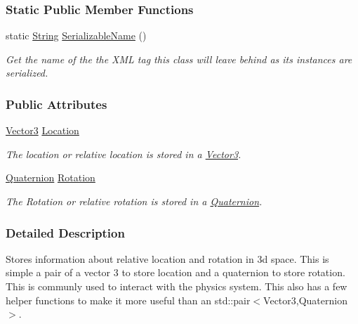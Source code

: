 \subsubsection*{Static Public Member Functions}
\begin{DoxyCompactItemize}
\item 
static \hyperlink{namespacephys_aa03900411993de7fbfec4789bc1d392e}{String} \hyperlink{classphys_1_1Transform_a96928e50ee68c30a3e4afa6b2b199c9e}{SerializableName} ()
\begin{DoxyCompactList}\small\item\em Get the name of the the XML tag this class will leave behind as its instances are serialized. \item\end{DoxyCompactList}\end{DoxyCompactItemize}
\subsubsection*{Public Attributes}
\begin{DoxyCompactItemize}
\item 
\hypertarget{classphys_1_1Transform_a2d3cb85313d0aaa3f243cfa07ae4d90c}{
\hyperlink{classphys_1_1Vector3}{Vector3} \hyperlink{classphys_1_1Transform_a2d3cb85313d0aaa3f243cfa07ae4d90c}{Location}}
\label{classphys_1_1Transform_a2d3cb85313d0aaa3f243cfa07ae4d90c}

\begin{DoxyCompactList}\small\item\em The location or relative location is stored in a \hyperlink{classphys_1_1Vector3}{Vector3}. \item\end{DoxyCompactList}\item 
\hypertarget{classphys_1_1Transform_a5e6cef1f7e16d937911f95e4b86ecddd}{
\hyperlink{classphys_1_1Quaternion}{Quaternion} \hyperlink{classphys_1_1Transform_a5e6cef1f7e16d937911f95e4b86ecddd}{Rotation}}
\label{classphys_1_1Transform_a5e6cef1f7e16d937911f95e4b86ecddd}

\begin{DoxyCompactList}\small\item\em The Rotation or relative rotation is stored in a \hyperlink{classphys_1_1Quaternion}{Quaternion}. \item\end{DoxyCompactList}\end{DoxyCompactItemize}


\subsubsection{Detailed Description}
Stores information about relative location and rotation in 3d space. This is simple a pair of a vector 3 to store location and a quaternion to store rotation. This is communly used to interact with the physics system. This also has a few helper functions to make it more useful than an std::pair$<$Vector3,Quaternion$>$. 


